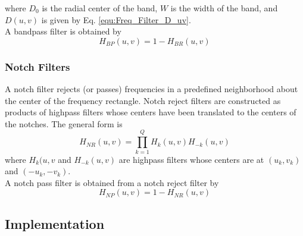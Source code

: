 where $D_0$ is the radial center of the band, $W$ is the width of the band, and $D(u,v)$ is given by Eq. \ref{equ:Freq_Filter_D_uv}. \\

A bandpass filter is obtained by
\begin{equation}
	H_{BP}(u,v) = 1 - H_{BR}(u,v)
\end{equation}

\subsubsection{Notch Filters}
A notch filter rejects (or passes) frequencies in a predefined neighborhood about the center of the frequency rectangle. Notch reject filters are constructed as products of highpass filters whose centers have been translated to the centers of the notches. The general form is
\begin{equation}
	H_{NR}(u,v) = \prod_{k=1}^{Q} H_k(u,v) H_{-k}(u,v)
\end{equation}
where $H_k(u,v$ and $H_{-k}(u,v)$ are highpass filters whose centers are at $(u_k,v_k)$ and $(-u_k,-v_k)$. \\

A notch pass filter is obtained from a notch reject filter by
\begin{equation}
	H_{NP}(u,v) = 1 - H_{NR}(u,v)
\end{equation}

\subsection{Implementation }